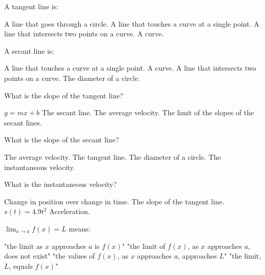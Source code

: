 \documentclass[addpoints, 12pt]{exam}%
\newcommand{\spc}{\vspace*{0.5cm}}
\begin{document}
\begin{questions}

\question[1]
A tangent line is:
    
\begin{choices}
\choice A line that goes through a circle.
\CorrectChoice A line that touches a curve at a single point.
\choice A line that intersects two points on a curve.
\choice A curve.
\end{choices}

\spc

\question[1]
A secant line is:

\begin{choices}
\choice A line that touches a curve at a single point. 
\choice A curve.
\CorrectChoice A line that intersects two points on a curve.
\choice The diameter of a circle.
\end{choices}

\spc

\question[1]
What is the slope of the tangent line?

\begin{choices}
\choice $y = mx + b$
\choice The secant line.
\choice The average velocity.
\CorrectChoice The limit of the slopes of the secant lines.
\end{choices}

\spc

\question[1]
What is the slope of the secant line?

\begin{choices}
\CorrectChoice The average velocity.
\choice The tangent line.
\choice The diameter of a circle.
\choice The instantaneous velocity.
\end{choices}

\spc
\newpage
\question[1]
What is the instantaneous velocity?

\begin{choices}
\choice Change in position over change in time.
\CorrectChoice The slope of the tangent line.
\choice $s(t) = 4.9t^2$
\choice Acceleration. 
\end{choices}

\spc

\question[1]
$\lim_{x \to a} f(x) = L$ means:

\begin{choices}
\choice "the limit as $x$ approaches $a$ is $f(x)$"
\choice "the limit of $f(x)$, as $x$ approaches $a$, does not exist"
\CorrectChoice "the values of $f(x)$, as $x$ approaches $a$, approaches $L$"
\choice "the limit, $L$, equals $f(x)$"
\end{choices}


\end{questions}
\end{document}
